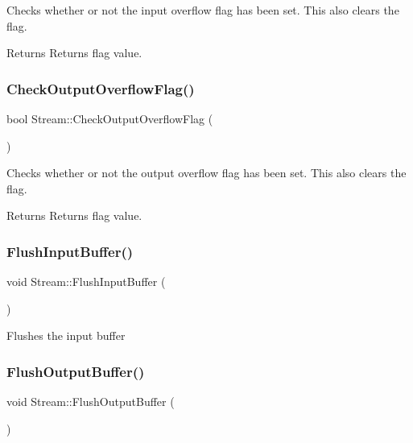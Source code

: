 Checks whether or not the input overflow flag has been set. This also clears the flag. \begin{DoxyReturn}{Returns}
Returns flag value. 
\end{DoxyReturn}
\hypertarget{class_stream_aee6c201819b874c5934a270592d9d311}{}\label{class_stream_aee6c201819b874c5934a270592d9d311} 
\subsubsection{\texorpdfstring{Check\+Output\+Overflow\+Flag()}{CheckOutputOverflowFlag()}}
{\footnotesize\ttfamily bool Stream\+::\+Check\+Output\+Overflow\+Flag (\begin{DoxyParamCaption}{ }\end{DoxyParamCaption})\hspace{0.3cm}{\ttfamily [virtual]}}

Checks whether or not the output overflow flag has been set. This also clears the flag. \begin{DoxyReturn}{Returns}
Returns flag value. 
\end{DoxyReturn}
\hypertarget{class_stream_ac7e3629626c1ea4d9cba88db1e048132}{}\label{class_stream_ac7e3629626c1ea4d9cba88db1e048132} 
\subsubsection{\texorpdfstring{Flush\+Input\+Buffer()}{FlushInputBuffer()}}
{\footnotesize\ttfamily void Stream\+::\+Flush\+Input\+Buffer (\begin{DoxyParamCaption}{ }\end{DoxyParamCaption})\hspace{0.3cm}{\ttfamily [virtual]}}

Flushes the input buffer \hypertarget{class_stream_a0af6193f98fcf7bcd60eef84fce8699c}{}\label{class_stream_a0af6193f98fcf7bcd60eef84fce8699c} 
\subsubsection{\texorpdfstring{Flush\+Output\+Buffer()}{FlushOutputBuffer()}}
{\footnotesize\ttfamily void Stream\+::\+Flush\+Output\+Buffer (\begin{DoxyParamCaption}{ }\end{DoxyParamCaption})\hspace{0.3cm}{\ttfamily [virtual]}}

